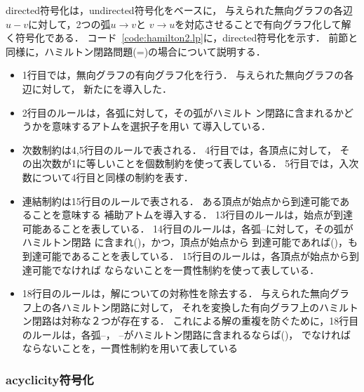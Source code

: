 \textsf{directed}符号化は，\textsf{undirected}符号化をベースに，
与えられた無向グラフの各辺$u-v$に対して，2つの弧$u\rightarrow v$と
$v\rightarrow u$を対応させることで有向グラフ化して解く符号化である．
コード~\ref{code:hamilton2.lp}に，\textsf{directed}符号化を示す．
前節と同様に，ハミルトン閉路問題(=)の場合について説明する．

\begin{itemize}
\item 1行目では，無向グラフの有向グラフ化を行う．
  与えられた無向グラフの各辺に対して，
  新たにを導入した．
\item 2行目のルールは，各弧に対して，その弧がハミルト
  ン閉路に含まれるかどうかを意味するアトムを選択子を用い
  て導入している．
\item 次数制約は4,5行目のルールで表される．
  4行目では，各頂点に対して，
  その出次数が1に等しいことを個数制約を使って表している．
  5行目では，入次数について4行目と同様の制約を表す．
\item 連結制約は15行目のルールで表される．
  ある頂点が始点から到達可能であることを意味する
  補助アトムを導入する．
  13行目のルールは，始点が到達可能あることを表している．
  14行目のルールは，各弧--に対して，その弧がハミルトン閉路
  に含まれ()，かつ，頂点が始点から
  到達可能であれば()，も到達可能であることを表している．
  15行目のルールは，各頂点が始点から到達可能でなければ
  ならないことを一貫性制約を使って表している．
\item 18行目のルールは，解についての対称性を除去する．
  与えられた無向グラフ上の各ハミルトン閉路に対して，
  それを変換した有向グラフ上のハミルトン閉路は対称な２つが存在する．
  これによる解の重複を防ぐために，18行目のルールは，各弧--，
  --がハミルトン閉路に含まれるならば()，
  でなければならないことを，一貫性制約を用いて表している
\end{itemize}

\subsubsection{\textsf{acyclicity}符号化}



